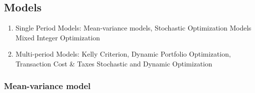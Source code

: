 \documentclass[11pt, openany]{book}              %
\begin{document}
\subsection{Models}

\begin{enumerate}
	\item Single Period Models: Mean-variance models, Stochastic Optimization Models
		\subitem  Mixed Integer Optimization
	\item Multi-period Models: Kelly Criterion, Dynamic Portfolio Optimization, Transaction Cost \& Taxes
		\subitem  Stochastic and Dynamic Optimization
\end{enumerate}

\subsubsection{Mean-variance model}
\end{document}
